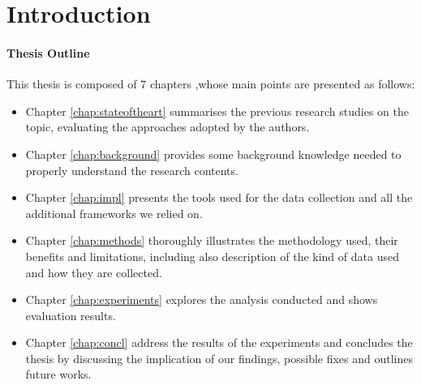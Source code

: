 \chapter{Introduction}
\label{chap:intro}


\subsubsection*{Thesis Outline}
\label{subsec:outline}

This thesis is composed of 7 chapters ,whose main points are presented as follows:
\begin{itemize}
	\item Chapter \ref{chap:stateoftheart} summarises the previous research 
	studies on the topic, evaluating the approaches adopted by the authors.
	
	\item Chapter \ref{chap:background} provides some background knowledge 
	needed to properly understand the research contents.
	
	\item Chapter \ref{chap:impl} presents the tools used for the data collection 
	and all the additional frameworks we relied on.
		
	\item Chapter \ref{chap:methods} thoroughly illustrates the methodology used, 
	their benefits and limitations, including also description of the kind of data 
	used and how they are collected. 

	\item Chapter \ref{chap:experiments} explores the analysis conducted and 
	shows evaluation results.	
	
	\item Chapter \ref{chap:concl} address the results of the experiments and 
	concludes the thesis by discussing the implication of our findings, possible fixes 
	and outlines future works.
	
\end{itemize}

